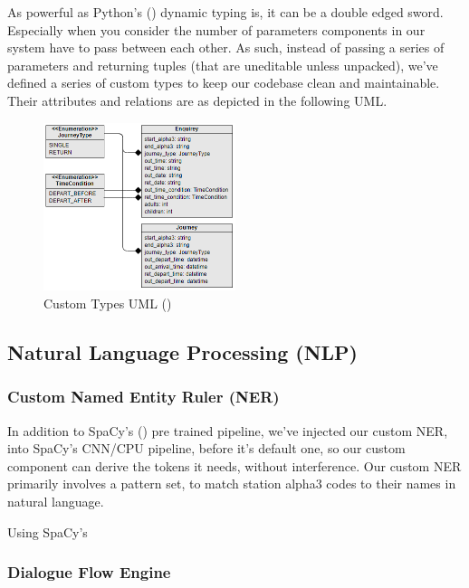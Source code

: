 \documentclass[11pt]{article}
\begin{document}
As powerful as Python's (\cite{python}) dynamic typing is, it can be a double edged sword. Especially when you consider the number of parameters components in our system have to pass between each other. As such, instead of passing a series of parameters and returning tuples (that are uneditable unless unpacked), we've defined a series of custom types to keep our codebase clean and maintainable. Their attributes and relations are as depicted in the following UML.

\begin{figure}[h]
    \centering
    \includegraphics[width=0.5\textwidth]{images/UML_utils.png}
    \caption{Custom Types UML (\cite{visual-paradigm})}
    \label{fig:custom-types-uml}
\end{figure}


\subsection{Natural Language Processing (NLP)} \label{nlp-design}


\subsubsection{Custom Named Entity Ruler (NER)} \label{named-entity-ruler-design}

In addition to SpaCy's (\cite{spacy}) pre trained pipeline, we've injected our custom NER, into SpaCy's CNN/CPU pipeline, before it's default one, so our custom component can derive the tokens it needs, without interference. Our custom NER primarily involves a pattern set, to match station alpha3 codes to their names in natural language.

Using SpaCy's 


\subsubsection{Dialogue Flow Engine} \label{dialogue-flow-design}
\end{document}
